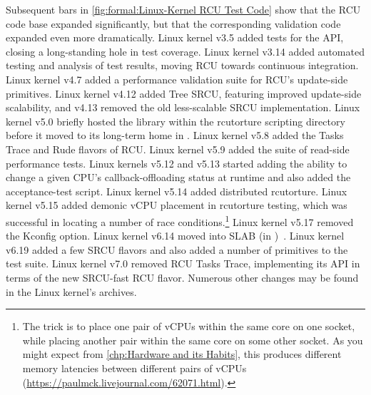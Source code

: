 Subsequent bars in \cref{fig:formal:Linux-Kernel RCU Test Code} show
that the RCU code base expanded significantly, but that the
corresponding validation code expanded even more dramatically.
Linux kernel v3.5 added tests for the  API, closing
a long-standing hole in test coverage.
Linux kernel v3.14 added automated testing and analysis of test results,
moving RCU towards continuous integration.
Linux kernel v4.7 added a performance validation suite for RCU's update-side
primitives.
Linux kernel v4.12 added Tree SRCU, featuring improved update-side
scalability, and v4.13 removed the old less-scalable SRCU implementation.
Linux kernel v5.0 briefly hosted the  library within
the rcutorture scripting directory before it moved to its long-term
home in .
Linux kernel v5.8 added the Tasks Trace and Rude flavors of RCU\@.
Linux kernel v5.9 added the  suite of read-side performance
tests.
Linux kernels v5.12 and v5.13 started adding the ability to change a
given CPU's callback-offloading status at runtime and also added the
 acceptance-test script.
Linux kernel v5.14 added distributed rcutorture.
Linux kernel v5.15 added demonic vCPU placement in rcutorture testing,
which was successful in locating a number of race conditions.\footnote{
	The trick is to place one pair of vCPUs within the same core on
	one socket, while placing another pair within the same core on
	some other socket.
	As you might expect from \cref{chp:Hardware and its Habits},
	this produces different memory latencies between different
	pairs of vCPUs
	(\url{https://paulmck.livejournal.com/62071.html}).}
Linux kernel v5.17 removed the  Kconfig option.
Linux kernel v6.14 moved  into SLAB (in
)~\cite{20241212180208.274813-1-urezki}.
Linux kernel v6.19 added a few SRCU flavors and also added a number of
primitives to the  test suite.
Linux kernel v7.0 removed RCU Tasks Trace, implementing its API in terms
of the new SRCU-fast RCU flavor.
Numerous other changes may be found in the Linux kernel's  archives.
